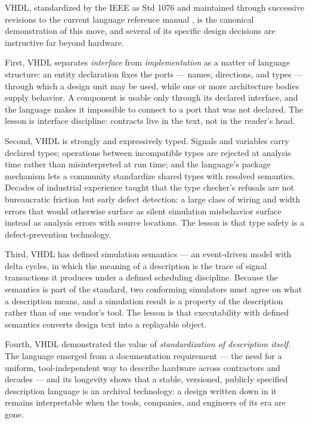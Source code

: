 VHDL, standardized by the IEEE as Std 1076 and maintained through successive
revisions to the current language reference manual \cite{vhdl}, is the
canonical demonstration of this move, and several of its specific design
decisions are instructive far beyond hardware.

First, VHDL separates \emph{interface} from \emph{implementation} as a
matter of language structure: an entity declaration fixes the ports ---
names, directions, and types --- through which a design unit may be used,
while one or more architecture bodies supply behavior. A component is usable
only through its declared interface, and the language makes it impossible to
connect to a port that was not declared. The lesson is interface
discipline: contracts live in the text, not in the reader's head.

Second, VHDL is strongly and expressively typed. Signals and variables
carry declared types; operations between incompatible types are rejected at
analysis time rather than misinterpreted at run time; and the language's
package mechanism lets a community standardize shared types with resolved
semantics. Decades of industrial experience taught that the type checker's
refusals are not bureaucratic friction but early defect detection: a large
class of wiring and width errors that would otherwise surface as silent
simulation misbehavior surface instead as analysis errors with source
locations. The lesson is that type safety is a defect-prevention
technology.

Third, VHDL has defined simulation semantics --- an event-driven model with
delta cycles, in which the meaning of a description is the trace of signal
transactions it produces under a defined scheduling discipline. Because the
semantics is part of the standard, two conforming simulators must agree on
what a description means, and a simulation result is a property of the
description rather than of one vendor's tool. The lesson is that
executability with defined semantics converts design text into a
replayable object.

Fourth, VHDL demonstrated the value of \emph{standardization of description
itself}. The language emerged from a documentation requirement --- the need
for a uniform, tool-independent way to describe hardware across
contractors and decades --- and its longevity shows that a stable,
versioned, publicly specified description language is an archival
technology: a design written down in it remains interpretable when the
tools, companies, and engineers of its era are gone.

